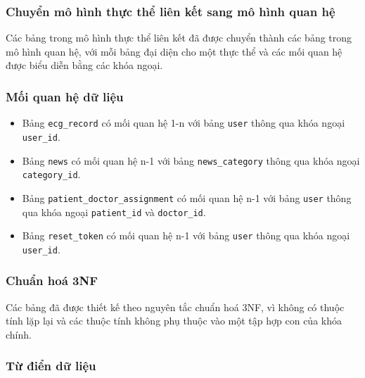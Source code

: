 \documentclass{article}%
\begin{document}
\subsubsection{Chuyển mô hình thực thể liên kết sang mô hình quan hệ}
Các bảng trong mô hình thực thể liên kết đã được chuyển thành các bảng trong mô hình quan hệ, với mỗi bảng đại diện cho một thực thể và các mối quan hệ được biểu diễn bằng các khóa ngoại.

\subsubsection{Mối quan hệ dữ liệu}

\begin{itemize}
  \item Bảng \texttt{ecg\_record} có mối quan hệ 1-n với bảng \texttt{user} thông qua khóa ngoại \texttt{user\_id}.
  \item Bảng \texttt{news} có mối quan hệ n-1 với bảng \texttt{news\_category} thông qua khóa ngoại \texttt{category\_id}.
  \item Bảng \texttt{patient\_doctor\_assignment} có mối quan hệ n-1 với bảng \texttt{user} thông qua khóa ngoại \texttt{patient\_id} và \texttt{doctor\_id}.
  \item Bảng \texttt{reset\_token} có mối quan hệ n-1 với bảng \texttt{user} thông qua khóa ngoại \texttt{user\_id}.
\end{itemize}

\subsubsection{Chuẩn hoá 3NF}
Các bảng đã được thiết kế theo nguyên tắc chuẩn hoá 3NF, vì không có thuộc tính lặp lại và các thuộc tính không phụ thuộc vào một tập hợp con của khóa chính.
\subsubsection{Từ điển dữ liệu}
\end{document}
